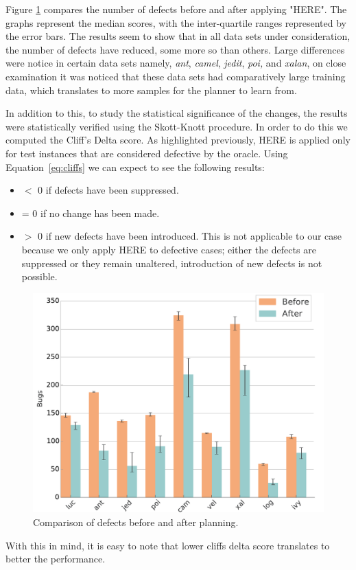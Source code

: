 \documentclass[conference]{IEEEtran}
\newcommand{\eq}[1]{Equation~\ref{eq:#1}}
\newcommand{\bi}{\begin{itemize}}
\newcommand{\ei}{\end{itemize}}
\begin{document}
{Figure \ref{fig:bugs} compares the number of defects before and after applying "HERE". The graphs represent the median scores, with the inter-quartile ranges represented by the error bars. The results seem to show that in all data sets under consideration, the number of defects have reduced, some more so than others. Large differences were notice in certain data sets namely, \textit{ant}, \textit{camel}, \textit{jedit}, \textit{poi,} and \textit{xalan}, on close examination it was noticed that these data sets had comparatively large training data, which translates to more samples for the planner to learn from.

In addition to this, to study the statistical significance of the changes, the results were statistically verified using the Skott-Knott procedure. In order to do this we computed the Cliff's Delta score. As highlighted previously, HERE is applied only for test instances that are considered defective by the oracle. Using \eq{cliffs} we can expect to see the following results:

\bi
\item $\lt$ 0 if defects have been suppressed.
\item = 0 if no change has been made.
\item $\gt$ 0 if new defects have been introduced. This is not applicable to our case because we only apply HERE to defective cases; either the defects are suppressed or they remain unaltered, introduction of new defects is not possible.
\ei


\begin{figure}[tbp]
\centering
\includegraphics[width=\linewidth]{_figs/histograms.pdf}
\caption{Comparison of defects before and after planning.}
\label{fig:bugs}
\end{figure}
With this in mind, it is easy to note that lower cliffs delta score translates to better the performance. 

}
\end{document}
